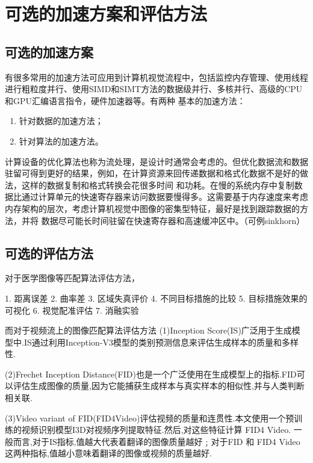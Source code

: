 
\section{可选的加速方案和评估方法}

\subsection{可选的加速方案}

有很多常用的加速方法可应用到计算机视觉流程中，包括监控内存管理、使用线程进行粗粒度并行、使用SIMD和SIMT方法的数据级并行、多核并行、高级的CPU和GPU汇编语言指令，硬件加速器等。有两种
基本的加速方法：
\begin{enumerate}
    \item 针对数据的加速方法；
    \item 针对算法的加速方法。
\end{enumerate}

计算设备的优化算法也称为流处理，是设计时通常会考虑的。但优化数据流和数据驻留可得到更好的结果，例如，在计算资源来回传递数据和格式化数据不是好的做法，这样的数据复制和格式转换会花很多时间
和功耗。在慢的系统内存中复制数据比通过计算单元的快速寄存器来访问数据要慢得多。这需要基于内存速度来考虑内存架构的层次，考虑计算机视觉中图像的密集型特征，最好是找到跟踪数据的方法，并将
数据尽可能长时间驻留在快速寄存器和高速缓冲区中。（可例sinkhorn）

\subsection{可选的评估方法}

对于医学图像等匹配算法评估方法，

1. 距离误差
2. 曲率差
3. 区域失真评价
4. 不同目标措施的比较
5. 目标措施效果的可视化
6. 视觉配准评估
7. 消融实验

而对于视频流上的图像匹配算法评估方法
(1)Inception Score(IS)\cite{salimans2016improved}广泛用于生成模型中.IS通过利用Inception-V3模型\cite{szegedy2016rethinking}的类别预测信息来评估生成样本的质量和多样性.

(2)Frechet Inception Distance(FID)\cite{heusel2017gans}也是一个广泛使用在生成模型上的指标.FID可以评估生成图像的质量,因为它能捕获生成样本与真实样本的相似性,并与人类判断相关联.

(3)Video variant of FID(FID4Video)\cite{carreira2017quo}评估视频的质量和连贯性.本文使用一个预训练的视频识别模型I3D\cite{carreira2017quo}对视频序列提取特征.然后,对这些特征计算 FID4 Video.
一般而言,对于IS指标,值越大代表着翻译的图像质量越好﹔对于FID 和 FID4 Video这两种指标,值越小意味着翻译的图像或视频的质量越好.
